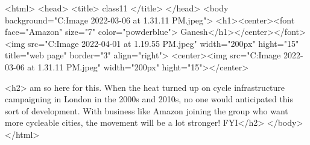 <html>
<head>
<title> class11 </title>
</head>
<body background="C:\Users\ganes\Downloads\WhatsApp Image 2022-03-06 at 1.31.11 PM.jpeg">
<h1><center><font face="Amazon" size="7" color="powderblue"> Ganesh</h1></center></font>
<img src="C:\Users\ganes\Downloads\WhatsApp Image 2022-04-01 at 1.19.55 PM.jpeg" width="200px" hight="15" title="web page" border="3" align="right">
<center><img src="C:\Users\ganes\Downloads\WhatsApp Image 2022-03-06 at 1.31.11 PM.jpeg" width="200px" hight="15"></center>


<h2>  am so here for this. When the heat turned up on cycle infrastructure campaigning in London in the 2000s and 2010s, 
no one would anticipated this sort of development.
 With business like Amazon joining the group who want more cycleable cities, the movement will be a lot stronger! FYI</h2>
</body>
</html>



